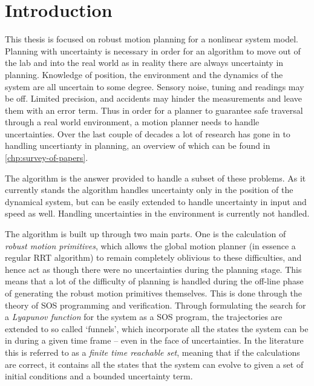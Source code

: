 \chapter{Introduction}
\label{sec:intro}


This thesis is focused on robust motion planning for a nonlinear system model.
Planning with uncertainty is necessary in order for an algorithm to move out of
the lab and into the real world as in reality there are always uncertainty in
planning. Knowledge of position, the environment and the dynamics of the system
are all uncertain to some degree. Sensory noise, tuning and readings may be off.
Limited precision, and accidents may hinder the measurements and leave them with
an error term. Thus in order for a planner to guarantee safe traversal through a
real world environment, a motion planner needs to handle uncertainties. Over the
last couple of decades a lot of research has gone in to handling uncertianty in
planning, an overview of which can be found in \cref{chp:survey-of-papers}.


The \rrtfunnel{} algorithm is the answer provided to handle a subset of these
problems. As it currently stands the algorithm handles uncertainty only in the
position of the dynamical system, but can be easily extended to handle
uncertainty in input and speed as well. Handling uncertainties in the
environment is currently not handled.


The algorithm is built up through two main parts. One is the calculation of
\textit{robust motion primitives}, which allows the global motion planner (in
essence a regular \ac{RRT} algorithm) to remain completely oblivious to these
difficulties, and hence act as though there were no uncertainties during the
planning stage. This means that a lot of the difficulty of planning is handled
during the off-line phase of generating the robust motion primitives themselves.
This is done through the theory of \ac{SOS} programming and verification.
Through formulating the search for a \textit{Lyapunov function} for the system
as a \ac{SOS} program, the trajectories are extended to so called `funnels',
which incorporate all the states the system can be in during a given time frame
-- even in the face of uncertainties. In the literature this is referred to as a
\textit{finite time reachable set}, meaning that if the calculations are
correct, it contains all the states that the system can evolve to given a set of
initial conditions and a bounded uncertainty term.



